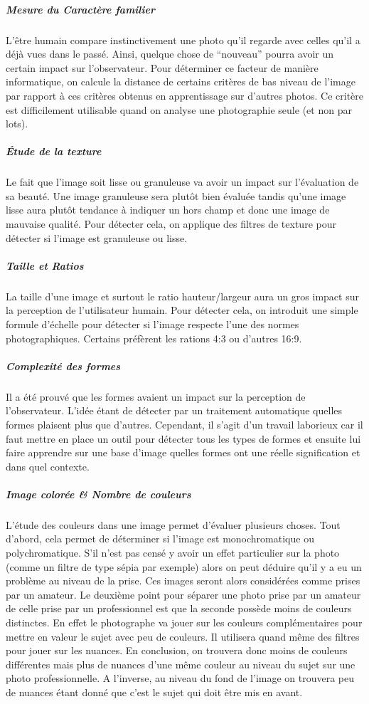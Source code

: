 \documentclass[11pt, french]{report-rd-info}
\begin{document}
\subparagraph{Mesure du Caractère familier}
L’être humain compare instinctivement une photo qu’il regarde avec celles qu’il a déjà vues dans le passé. Ainsi, quelque chose de “nouveau” pourra avoir un certain impact sur l’observateur. Pour déterminer ce facteur de manière informatique, on calcule la distance de certains critères de bas niveau de l’image par rapport à ces critères obtenus en apprentissage sur d’autres photos. Ce critère est difficilement utilisable quand on analyse une photographie seule (et non par lots).


\subparagraph{Étude de la texture}
Le fait que l’image soit lisse ou granuleuse va avoir un impact sur l’évaluation de sa beauté. Une image granuleuse sera plutôt bien évaluée tandis qu’une image lisse aura plutôt tendance à indiquer un hors champ et donc une image de mauvaise qualité. Pour détecter cela, on applique des filtres de texture pour détecter si l’image est granuleuse ou lisse.


\subparagraph{Taille et Ratios}
La taille d’une image et surtout le ratio hauteur/largeur aura un gros impact sur la perception de l’utilisateur humain. Pour détecter cela, on introduit une simple formule d’échelle pour détecter si l’image respecte l’une des normes photographiques. Certains préfèrent les rations 4:3 ou d’autres 16:9.


\subparagraph{Complexité des formes}
Il a été prouvé que les formes avaient un impact sur la perception de l’observateur. L'idée étant de détecter par un traitement automatique quelles formes plaisent plus que d’autres. Cependant, il s’agit d’un travail laborieux car il faut mettre en place un outil pour détecter tous les types de formes et ensuite lui faire apprendre sur une base d’image quelles formes ont une réelle signification et dans quel contexte. 


\subparagraph{Image colorée \& Nombre de couleurs}
L’étude des couleurs dans une image permet d’évaluer plusieurs choses. Tout d’abord, cela permet de déterminer si l’image est monochromatique  ou polychromatique. S’il n’est pas censé y avoir un effet particulier sur la photo (comme un filtre de type sépia par exemple) alors on peut déduire qu’il y a eu un problème au niveau de la prise. Ces images seront alors considérées comme prises par un amateur.
Le deuxième point pour séparer une photo prise par un amateur de celle prise par un professionnel est que la seconde possède moins de couleurs distinctes. En effet le photographe va jouer sur les couleurs complémentaires pour mettre en valeur le sujet avec peu de couleurs. Il utilisera quand même des filtres pour jouer sur les nuances. En conclusion, on trouvera donc moins de couleurs différentes mais plus de nuances d’une même couleur au niveau du sujet sur une photo professionnelle. A l’inverse, au niveau du fond de l’image on trouvera peu de nuances étant donné que c’est le sujet qui doit être mis en avant.
\end{document}
